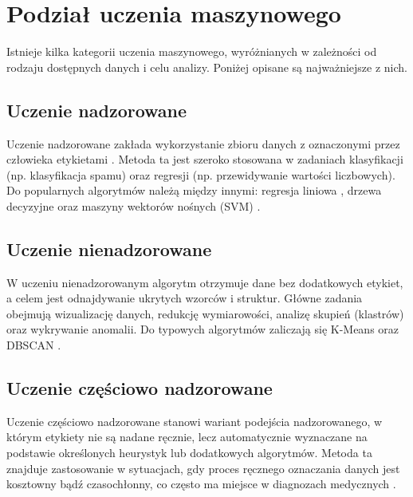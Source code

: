 \documentclass[a4paper, 12pt]{article}
\numberwithin{equation}{section}
\begin{document}
    \section{Podział uczenia maszynowego}
    Istnieje kilka kategorii uczenia maszynowego, wyróżnianych w zależności od rodzaju dostępnych danych i celu analizy. Poniżej opisane są najważniejsze z nich.
    
    \subsection{Uczenie nadzorowane}
    Uczenie nadzorowane zakłada wykorzystanie zbioru danych z oznaczonymi przez człowieka etykietami \cite{bishop2006pattern}. Metoda ta jest szeroko stosowana w zadaniach klasyfikacji (np. klasyfikacja spamu) oraz regresji (np. przewidywanie wartości liczbowych). Do popularnych algorytmów należą między innymi: regresja liniowa \cite{draper1998applied}, drzewa decyzyjne \cite{breiman1984classification} oraz maszyny wektorów nośnych (SVM) \cite{cortes1995support}.

    \subsection{Uczenie nienadzorowane}
    W uczeniu nienadzorowanym algorytm otrzymuje dane bez dodatkowych etykiet, a celem jest odnajdywanie ukrytych wzorców i struktur. Główne zadania obejmują wizualizację danych, redukcję wymiarowości, analizę skupień (klastrów) oraz wykrywanie anomalii. Do typowych algorytmów zaliczają się K-Means \cite{jain2010data} oraz DBSCAN \cite{schubert2017dbscan}.

    \subsection{Uczenie częściowo nadzorowane}
    Uczenie częściowo nadzorowane stanowi wariant podejścia nadzorowanego, w którym etykiety nie są nadane ręcznie, lecz automatycznie wyznaczane na podstawie określonych heurystyk lub dodatkowych algorytmów. Metoda ta znajduje zastosowanie w sytuacjach, gdy proces ręcznego oznaczania danych jest kosztowny bądź czasochłonny, co często ma miejsce w diagnozach medycznych \cite{esteva2017dermatologist}.
\end{document}
